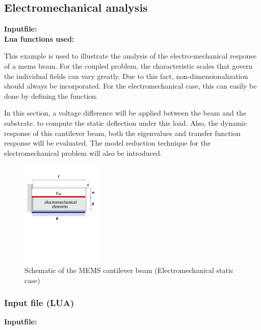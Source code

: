 \clearpage
\subsection{Electromechanical analysis}
\begin{flushleft}
  \textbf{Inputfile:}
  \\
  \textbf{Lua functions used:}
\end{flushleft}
This example is used to illustrate the analysis of the
electro-mechanical response of a mems beam. For the coupled
problem, the characteristic scales that govern the individual
fields can vary greatly. Due to this fact, non-dimensionalization
should always be incorporated. For the electromechanical case, this
can easily be done by defining the  function.

In this section, a voltage difference will be applied between the 
beam and the substrate. to compute the static deflection
under this load. Also, the dynamic response of this cantilever
beam, both the eigenvalues and transfer function response will
be evaluated. The model reduction technique for the electromechanical
problem will also be introduced.

\begin{figure}[htbp]
\centering
\includegraphics[trim = 0in 4in 0.5in 0in, clip, height = 2in]{fig/memscantileverbeam_em.pdf}
\caption{Schematic of the MEMS cantilever beam 
                              (Electromechanical static case)}
\label{fig:MEMSCantileverBeam_EM}
\end{figure}

\clearpage
\subsubsection*{Input file (LUA)}
\begin{flushleft}
  \textbf{Inputfile:}
  \\
\end{flushleft}
\hspace{1in}
{\footnotesize
{}
}

